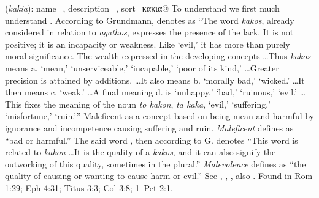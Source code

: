 \item[Malevolence,]

(\textit{kakia}):
{
    name=,
    description={},
    sort=κακια@
}
To understand  we first much understand . 
According to Grundmann,  denotes as ``The word \emph{kakos}, already considered in relation to \emph{agathos}, expresses the presence of the lack. It is not positive; it is an incapacity or weakness. Like `evil,' it has more than purely moral significance. The wealth expressed in the developing concepts \ldots Thus \emph{kakos} means a. `mean,' `unserviceable,' `incapable,' `poor of its kind,' \ldots Greater precision is attained by additions. \ldots It also means b. `morally bad,' `wicked.' \ldots It then means c. `weak.' \ldots A final meaning d. is `unhappy,' `bad,' `ruinous,' `evil.' \ldots This fixes the meaning of the noun \emph{to kakon}, \emph{ta kaka}, `evil,' `suffering,' `misfortune,' `ruin.'''  
Maleficent as a concept based on being mean and harmful by ignorance and incompetence causing suffering and ruin. \emph{Maleficent} defines as ``bad or harmful.'' 
The said word , then according to G. denotes ``This word is related to \emph{kakon} \ldots It is the quality of a \emph{kakos}, and it can also signify the outworking of this quality, sometimes in the plural.''
\emph{Malevolence} defines as ``the quality of causing or wanting to cause harm or evil.''
See , , , also .
Found in Rom 1:29; Eph 4:31; Titus 3:3; Col 3:8; 1~Pet 2:1.
